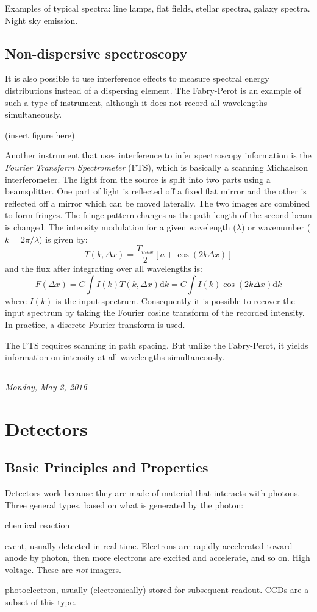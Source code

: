 \documentclass[12pt]{article}
\newcommand{\mydate}[1]{
    \begin{flushright}
        \rule{\textwidth}{0.4pt} %
        \small\hfill\textit{#1}
    \end{flushright}}
\begin{document}
Examples of typical spectra: line lamps, flat fields, stellar spectra,
galaxy spectra. Night sky emission.

\subsection{Non-dispersive spectroscopy}
It is also possible to use interference effects to measure spectral
energy distributions instead of a dispersing element. The Fabry-Perot
is an example of such a type of instrument, although it does not
record all wavelengths simultaneously.

(insert figure here)

Another instrument that uses interference to infer spectroscopy
information is the \textit{Fourier Transform Spectrometer} (FTS), which is
basically a scanning Michaelson interferometer. The light from the
source is split into two parts using a beamsplitter. One part of light
is reflected off a fixed flat mirror and the other is reflected off a
mirror which can be moved laterally. The two images are combined to
form fringes. The fringe pattern changes as the path length of the
second beam is changed. The intensity modulation for a given
wavelength ($\lambda$) or wavenumber ($k = 2\pi/\lambda$) is
given by:
\[
    T \left( k,\Delta{x} \right)
    = \frac{T_{max}}{2} \left[ a + \cos \left( 2k\Delta{x} \right) \right]
    \]
and the flux after integrating over all wavelengths is:
\[
    F \left( \Delta{x}\right)
    = C \int{ I(k) T (k,\Delta{x}) \mathrm{d}k}
    = C \int{ I(k) \cos (2k\Delta{x}) \mathrm{d}k}
    \]
where $I(k)$ is the input spectrum. Consequently it is possible to
recover the input spectrum by taking the Fourier cosine transform of
the recorded intensity. In practice, a discrete Fourier transform is
used.

The FTS requires scanning in path spacing. But unlike the Fabry-Perot,
it yields information on intensity at all wavelengths simultaneously.

\newpage
\mydate{Monday, May 2, 2016}
\section{Detectors}
\subsection{Basic Principles and Properties}
Detectors work because they are made of material that interacts
with photons. Three general types, based on what is generated
by the photon:
\begin{description}[labelwidth=10em, leftmargin=12em]
    \item [Photographic detector] chemical reaction
    \item [Photomultiplier/photon counter] event, usually detected
        in real time. Electrons are rapidly accelerated toward anode
        by photon, then more electrons are excited and accelerate, and
        so on. High voltage. These are \emph{not} imagers.
    \item [Photon collecter] photoelectron, usually (electronically)
        stored for subsequent readout. CCDs are a subset of this type.
\end{description}
\end{document}
